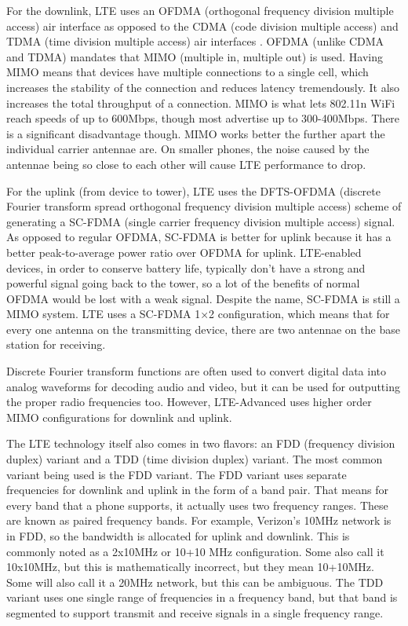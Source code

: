 \documentclass[12pt,onecolumn]{IEEEtran}
\begin{document}
For the downlink, LTE uses an OFDMA (orthogonal frequency division multiple access) air interface as opposed to the CDMA (code division multiple access) and TDMA (time division multiple access) air interfaces . OFDMA (unlike CDMA and TDMA) mandates that MIMO (multiple in, multiple out) is used. Having MIMO means that devices have multiple connections to a single cell, which increases the stability of the connection and reduces latency tremendously. It also increases the total throughput of a connection. MIMO is what lets 802.11n WiFi reach speeds of up to 600Mbps, though most advertise up to 300-400Mbps. There is a significant disadvantage though. MIMO works better the further apart the individual carrier antennae are. On smaller phones, the noise caused by the antennae being so close to each other will cause LTE performance to drop. 

For the uplink (from device to tower), LTE uses the DFTS-OFDMA (discrete Fourier transform spread orthogonal frequency division multiple access) scheme of generating a SC-FDMA (single carrier frequency division multiple access) signal. As opposed to regular OFDMA, SC-FDMA is better for uplink because it has a better peak-to-average power ratio over OFDMA for uplink. LTE-enabled devices, in order to conserve battery life, typically don’t have a strong and powerful signal going back to the tower, so a lot of the benefits of normal OFDMA would be lost with a weak signal. Despite the name, SC-FDMA is still a MIMO system. LTE uses a SC-FDMA 1×2 configuration, which means that for every one antenna on the transmitting device, there are two antennae on the base station for receiving.

Discrete Fourier transform functions are often used to convert digital data into analog waveforms for decoding audio and video, but it can be used for outputting the proper radio frequencies too. However, LTE-Advanced uses higher order MIMO configurations for downlink and uplink.

The LTE technology itself also comes in two flavors: an FDD (frequency division duplex) variant and a TDD (time division duplex) variant. The most common variant being used is the FDD variant. The FDD variant uses separate frequencies for downlink and uplink in the form of a band pair. That means for every band that a phone supports, it actually uses two frequency ranges. These are known as paired frequency bands. For example, Verizon’s 10MHz network is in FDD, so the bandwidth is allocated for uplink and downlink. This is commonly noted as a 2x10MHz or 10+10 MHz configuration. Some also call it 10x10MHz, but this is mathematically incorrect, but they mean 10+10MHz. Some will also call it a 20MHz network, but this can be ambiguous. The TDD variant uses one single range of frequencies in a frequency band, but that band is segmented to support transmit and receive signals in a single frequency range.
\end{document}

